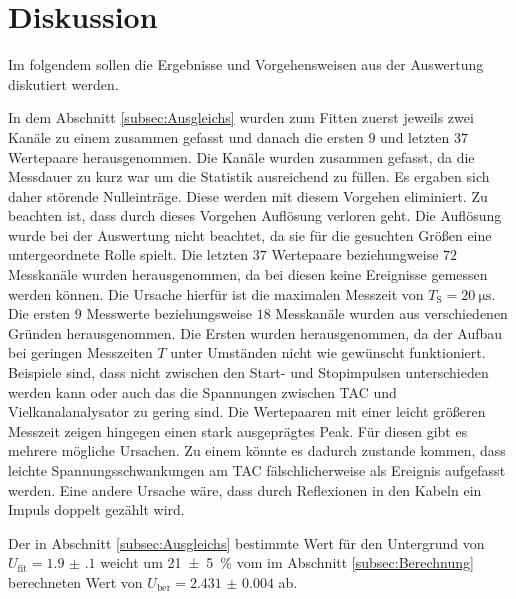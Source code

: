 
\section{Diskussion}
\label{sec:Diskussion}
Im folgendem sollen die Ergebnisse und Vorgehensweisen aus der Auswertung diskutiert werden.

In dem Abschnitt \ref{subsec:Ausgleichs} wurden zum Fitten zuerst jeweils zwei Kanäle zu einem zusammen gefasst und danach die ersten $9$ und letzten $37$ Wertepaare herausgenommen.
Die Kanäle wurden zusammen gefasst, da die Messdauer zu kurz war um die Statistik ausreichend zu füllen. Es ergaben sich daher störende Nulleinträge. Diese werden mit diesem Vorgehen eliminiert. Zu beachten ist, dass durch dieses Vorgehen Auflösung verloren geht. Die Auflösung wurde bei der Auswertung nicht beachtet, da sie für die gesuchten Größen eine untergeordnete Rolle spielt. Die letzten $37$ Wertepaare beziehungweise $72$ Messkanäle wurden herausgenommen, da bei diesen keine Ereignisse gemessen werden können. Die Ursache hierfür ist die maximalen Messzeit von $T_\text{S}=\SI{20}{\micro\second}$. Die ersten $9$ Messwerte beziehungsweise $18$ Messkanäle wurden aus verschiedenen Gründen herausgenommen. Die Ersten wurden herausgenommen, da der Aufbau bei geringen Messzeiten $T$ unter Umständen nicht wie gewünscht funktioniert. Beispiele sind, dass nicht zwischen den Start- und Stopimpulsen unterschieden werden kann oder auch das die Spannungen zwischen TAC und Vielkanalanalysator zu gering sind. Die Wertepaaren mit einer leicht größeren Messzeit zeigen hingegen einen stark ausgeprägtes Peak. Für diesen gibt es mehrere mögliche Ursachen. Zu einem könnte es dadurch zustande kommen, dass leichte Spannungsschwankungen am TAC fälschlicherweise als Ereignis aufgefasst werden. Eine andere Ursache wäre, dass durch Reflexionen in den Kabeln ein Impuls doppelt gezählt wird.





Der in Abschnitt \ref{subsec:Ausgleichs} bestimmte Wert für den Untergrund von $U_\text{fit}=\num{1.9(1)}$ weicht um \SI{21(5)}{\percent} vom im Abschnitt \ref{subsec:Berechnung} berechneten Wert von $U_\text{ber}=\num{2.431(4)}$ ab.


